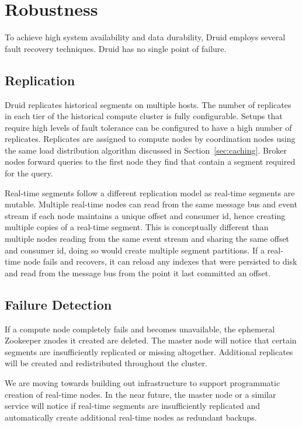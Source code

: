 \documentclass{vldb}
\begin{document}
\section{Robustness}
\label{sec:robustness}
To achieve high system availability and data durability, Druid employs
several fault recovery techniques. Druid has no single point of
failure.

\subsection{Replication}
Druid replicates historical segments on multiple hosts. The number of
replicates in each tier of the historical compute cluster is fully
configurable. Setups that require high levels of fault tolerance can
be configured to have a high number of replicates. Replicates are
assigned to compute nodes by coordination nodes using the same load
distribution algorithm discussed in Section~\ref{sec:caching}. Broker nodes forward queries to the first node they find that contain a segment required for the query.

Real-time segments follow a different replication model as real-time
segments are mutable. Multiple real-time nodes can read from the same message
bus and event stream if each node maintains a unique offset and consumer id, hence creating multiple copies
of a real-time segment. This is conceptually different than multiple
nodes reading from the same event stream and sharing the same offset and consumer id, doing so would create
multiple segment partitions. If a real-time node fails and recovers, it can
reload any indexes that were persisted to disk and read from the
message bus from the point it last committed an offset.

\subsection{Failure Detection}
If a compute node completely fails and becomes unavailable, the
ephemeral Zookeeper znodes it created are deleted. The master node
will notice that certain segments are insufficiently replicated or
missing altogether. Additional replicates will be created and
redistributed throughout the cluster.

We are moving towards building out infrastructure to support
programmatic creation of real-time nodes. In the near future, the
master node or a similar service will notice if real-time segments are insufficiently
replicated and automatically create additional real-time nodes as
redundant backups.
\end{document}
